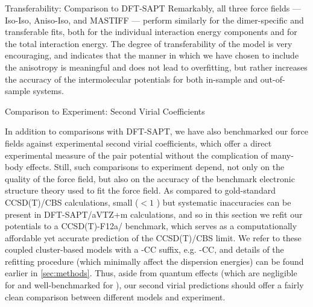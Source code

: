 \begin{subsection}{Transferability: Comparison to DFT-SAPT}
Remarkably, all three force fields --- Iso-Iso, Aniso-Iso, and MASTIFF --- perform
similarly for the dimer-specific and transferable fits, both for the
individual interaction energy components and for the total interaction
energy. The degree of transferability of the \mastiff model is very
encouraging,
and indicates that the manner in which we have chosen to include the
anisotropy is meaningful and does not lead to overfitting, but rather
increases the accuracy of the intermolecular potentials for both in-sample and
out-of-sample systems.



\end{subsection}
\begin{subsection}{Comparison to Experiment: Second Virial Coefficients}

In addition to comparisons with DFT-SAPT, we have also benchmarked our force
fields against experimental second
virial coefficients, 
which offer a direct experimental measure
of the pair potential without the complication of many-body effects.
%
Still, such comparisons to experiment depend, not only on the quality of the
force field, but also on the accuracy of the benchmark electronic structure
theory used to fit the force field. 
As compared to gold-standard CCSD(T)/CBS calculations,
small ($< 1$ \kjmolold) but systematic inaccuracies can be present in
DFT-SAPT/aVTZ+m\cite{VanVleet2016} calculations, 
and so in this section we refit our
potentials to 
a CCSD(T)-F12a/\avtzm
benchmark, which serves as a computationally affordable yet accurate prediction of
the CCSD(T)/CBS limit.\cite{Knizia2009,Kalugina2014}
%
We refer to these coupled cluster-based
models with a -CC suffix, e.g. \mastiff-CC, and details of the refitting
procedure (which minimally affect the dispersion energies)
can be found earlier in \cref{sec:methods}. 
Thus, aside from quantum effects (which
are negligible for \co\cite{Bukowski1999a}  and well-benchmarked for \ho\cite{Babin2013}), our second virial
predictions should offer a fairly clean comparison between different models
and experiment.


\end{subsection}
